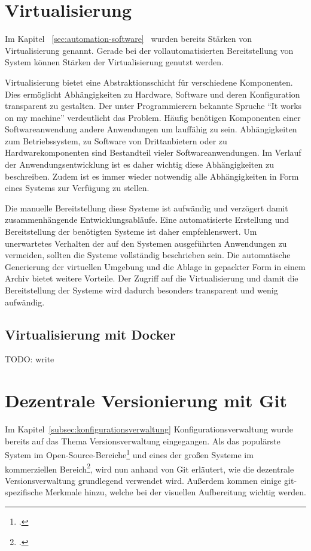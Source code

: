 \section{Virtualisierung}

Im Kapitel ~\ref{sec:automation-software}~ wurden bereits Stärken von Virtualisierung 
genannt. Gerade bei der vollautomatisierten Bereitstellung von System können Stärken der Virtualisierung genutzt werden.

Virtualisierung bietet eine Abstraktionsschicht für verschiedene Komponenten. Dies ermöglicht Abhängigkeiten zu Hardware, 
Software und deren Konfiguration transparent zu gestalten. Der unter Programmierern bekannte Spruche ``It works on my 
machine'' verdeutlicht das Problem. Häufig benötigen Komponenten einer Softwareanwendung andere Anwendungen um lauffähig 
zu sein. Abhängigkeiten zum Betriebssystem, zu Software von Drittanbietern oder zu Hardwarekomponenten sind Bestandteil 
vieler Softwareanwendungen. Im Verlauf der Anwendungsentwicklung ist es daher wichtig diese Abhängigkeiten zu 
beschreiben. Zudem ist es immer wieder notwendig alle Abhängigkeiten in Form eines Systems zur Verfügung zu stellen.

Die manuelle Bereitstellung diese Systeme ist aufwändig und verzögert damit zusammenhängende Entwicklungsabläufe. Eine 
automatisierte Erstellung und Bereitstellung der benötigten Systeme ist daher empfehlenswert. Um unerwartetes Verhalten 
der auf den Systemen ausgeführten Anwendungen zu vermeiden, sollten die Systeme vollständig beschrieben sein. Die 
automatische Generierung der virtuellen Umgebung und die Ablage in gepackter Form in einem Archiv bietet weitere 
Vorteile. Der Zugriff auf die Virtualisierung und damit die Bereitstellung der Systeme wird dadurch besonders transparent 
und wenig aufwändig.

\subsection{Virtualisierung mit Docker}

TODO: write

\section{Dezentrale Versionierung mit Git}

Im Kapitel~\ref{subsec:konfigurationsverwaltung} Konfigurationsverwaltung wurde bereits auf das Thema Versionsverwaltung 
eingegangen. Als das populärste System im Open-Source-Bereiche\footcite{openhub-pie-chart} und eines der großen Systeme 
im kommerziellen Bereich\footcite{g2crowd2018}, wird nun anhand von Git erläutert, wie die dezentrale Versionsverwaltung 
grundlegend verwendet wird. Außerdem kommen einige git-spezifische Merkmale hinzu, welche bei der visuellen Aufbereitung 
wichtig werden.

